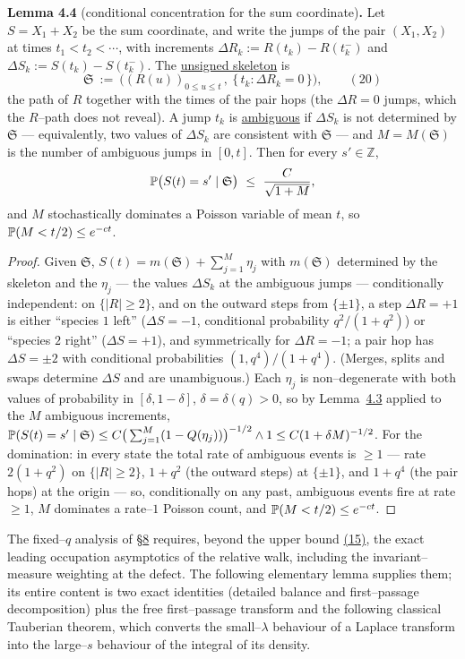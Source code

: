 \documentclass[11pt]{article}
\theoremstyle{plain}
\theoremstyle{definition}
\theoremstyle{remark}
\newcommand{\Z}{\mathbb{Z}}\newcommand{\R}{\mathbb{R}}\newcommand{\N}{\mathbb{N}}
\begin{document}
\label{lem_Slclt}\noindent\textbf{Lemma 4.4} (conditional concentration for the sum coordinate)\textbf{.} 
Let $S=X_1+X_2$ be the sum coordinate, and write the jumps of the pair $(X_1,X_2)$ at
times $t_1<t_2<\cdots$, with increments $\Delta R_k:=R(t_k)-R(t_k^-)$ and
$\Delta S_k:=S(t_k)-S(t_k^-)$. The \underline{unsigned skeleton} is
\label{eq_skeleton}
\begin{equation}
  \mathfrak S\ :=\ \Big((R(u))_{0\le u\le t}\,,\ \{\,t_k:\Delta R_k=0\,\}\Big),\qquad(20)
\end{equation}
the path of $R$ together with the times of the pair hops (the $\Delta R=0$ jumps, which
the $R$--path does not reveal). A jump $t_k$ is \underline{ambiguous} if $\Delta S_k$ is not
determined by $\mathfrak S$ --- equivalently, two values of $\Delta S_k$ are consistent
with $\mathfrak S$ --- and $M=M(\mathfrak S)$ is the number of ambiguous jumps in
$[0,t]$. Then for every $s'\in\Z$,
\[
  \PP\big(S(t)=s'\mid \mathfrak S\big)\ \le\ \frac{C}{\sqrt{1+M}},
\]
and $M$ stochastically dominates a Poisson variable of mean $t$, so
$\mathbb{P}(M<t/2)\le e^{-ct}$.
\par
\begin{proof}
Given $\mathfrak S$, $S(t)=m(\mathfrak S)+\sum_{j=1}^M\eta_j$ with $m(\mathfrak S)$
determined by the skeleton and the $\eta_j$ --- the values $\Delta S_k$ at the
ambiguous jumps --- conditionally independent: on
$\{|R|\ge2\}$, and on the outward steps from $\{\pm1\}$, a step $\Delta R=+1$ is
either ``species $1$ left'' ($\Delta S=-1$, conditional probability $q^2/(1+q^2)$) or
``species $2$ right'' ($\Delta S=+1$), and symmetrically for $\Delta R=-1$; a pair
hop has $\Delta S=\pm2$ with conditional probabilities $(1,q^4)/(1+q^4)$. (Merges,
splits and swaps determine $\Delta S$ and are unambiguous.) Each $\eta_j$ is
non--degenerate with both values of probability in $[\delta,1-\delta]$,
$\delta=\delta(q)>0$, so by Lemma~\hyperref[lem_KR]{4.3} applied to the $M$ ambiguous increments,
$\mathbb{P}(S(t)=s'\mid\mathfrak S)\le C\big(\sum_{j=1}^M(1-Q(\eta_j))\big)^{-1/2}\wedge1
\le C(1+\delta M)^{-1/2}$. For the domination: in every state the total rate of
ambiguous events is $\ge1$ --- rate $2(1+q^2)$ on $\{|R|\ge2\}$, $1+q^2$ (the outward
steps) at $\{\pm1\}$, and $1+q^4$ (the pair hops) at the origin --- so, conditionally
on any past, ambiguous events fire at rate $\ge1$, $M$ dominates a rate--$1$ Poisson
count, and $\mathbb{P}(M<t/2)\le e^{-ct}$.
\end{proof}

The fixed--$q$ analysis of \S\hyperref[sec_tw]{8} requires, beyond the upper bound
\hyperref[eq_tildeR]{(15)}, the exact leading occupation asymptotics of the relative walk,
including the invariant--measure weighting at the defect. The following elementary
lemma supplies them; its entire content is two exact identities (detailed balance and
first--passage decomposition) plus the free first--passage transform and the following
classical Tauberian theorem, which converts the small--$\lambda$ behaviour of a Laplace
transform into the large--$s$ behaviour of the integral of its density.
\end{document}
